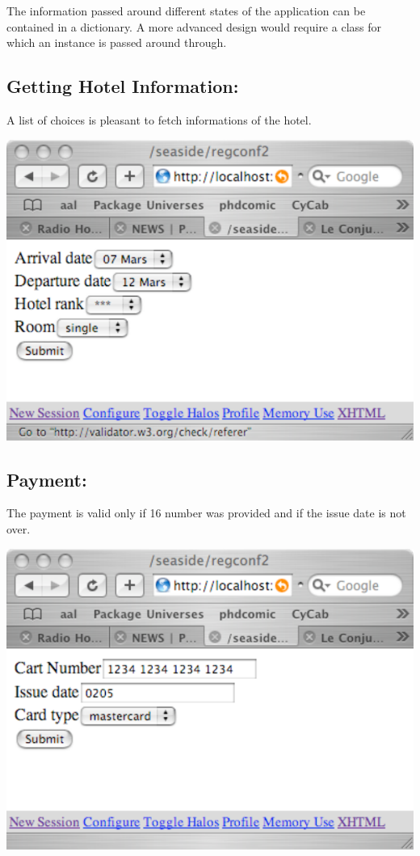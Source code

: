 

The information passed around different states of the application can be contained in a dictionary. A more advanced design would require a class  for which an instance is passed around through.

\subsection{Getting Hotel Information: }
A list of choices is pleasant to fetch informations of the hotel. 

\includegraphics[scale=0.7]{hotel}




\subsection{Payment: }
The payment is valid only if 16 number was provided and if the issue date is not over.

\includegraphics[scale=0.7]{creditcard}

